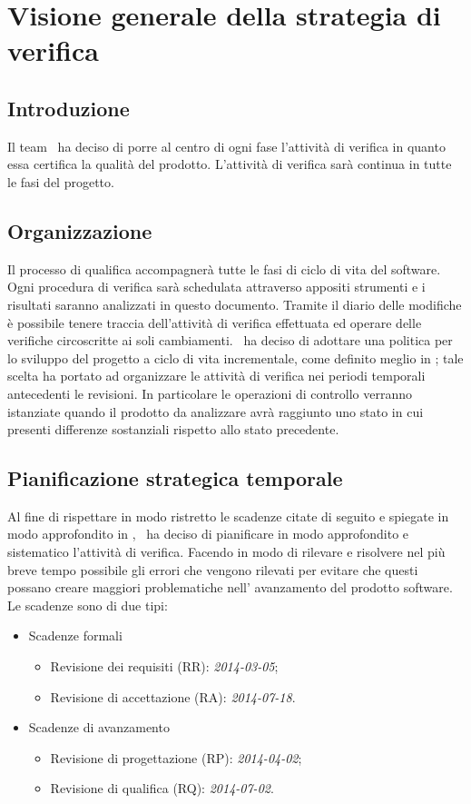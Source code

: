 \section{Visione generale della strategia di verifica}
\subsection{Introduzione}
Il team \gruppo ~ha deciso di porre al centro di ogni fase l'attività di verifica in quanto essa certifica la qualità del prodotto. L'attività di verifica sarà continua in tutte le fasi del progetto.\\
\subsection{Organizzazione}
Il processo di qualifica accompagnerà tutte le fasi di ciclo di vita del software. Ogni procedura di verifica sarà schedulata attraverso appositi strumenti e i risultati saranno analizzati in questo documento. Tramite il diario delle modifiche è possibile tenere traccia dell'attività di verifica effettuata ed operare delle verifiche circoscritte ai soli cambiamenti.
\gruppo ~ha deciso di adottare una politica per lo sviluppo del progetto a ciclo di vita incrementale, come definito meglio in \infoPDP; tale scelta ha portato ad organizzare le attività di verifica nei periodi temporali antecedenti le revisioni.
In particolare le operazioni di controllo verranno istanziate quando il prodotto da analizzare avrà raggiunto uno stato in cui presenti differenze sostanziali rispetto allo stato precedente.
\subsection{Pianificazione strategica temporale}
Al fine di rispettare in modo ristretto le scadenze citate di seguito e spiegate in modo approfondito in \infoPDP, \gruppo ~ha deciso di pianificare in modo approfondito e sistematico l'attività di verifica. Facendo in modo di rilevare e risolvere nel più breve tempo possibile gli errori che vengono rilevati per evitare che questi possano creare maggiori problematiche nell' avanzamento del prodotto software. Le scadenze sono di due tipi:
\begin{itemize}
\item Scadenze formali
\begin{itemize}
\item Revisione dei requisiti (RR): \textit{2014-03-05};
\item Revisione di accettazione (RA): \textit{2014-07-18}.
\end{itemize}
\item Scadenze di avanzamento
\begin{itemize}
\item Revisione di progettazione (RP): \textit{2014-04-02};
\item Revisione di qualifica (RQ): \textit{2014-07-02}.
\end{itemize}
\end{itemize}

